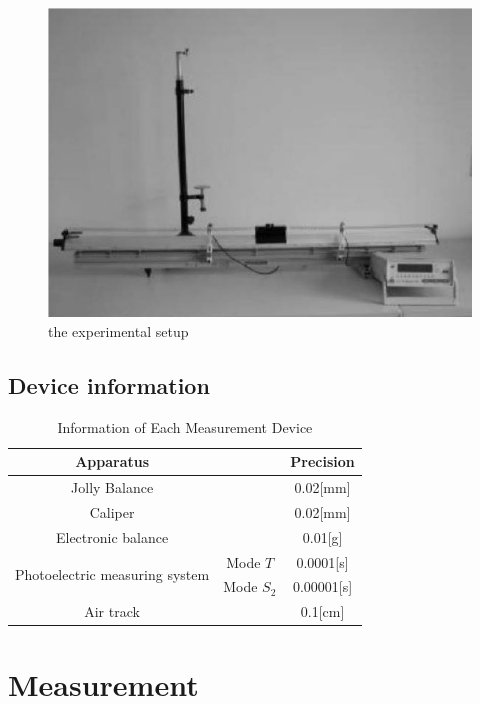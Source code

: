 \documentclass[12pt,a4paper]{article}
\begin{document}
\begin{figure}[H]
    \centering
    \includegraphics[width=12cm]{setup.png}
    \caption{the experimental setup}
\end{figure}

\subsection{Device information}

\begin{table}[H]
    \centering
    \begin{tabular}{ccc}
        \hline
    Apparatus & & Precision \\\hline  
    Jolly Balance & & 0.02[mm] \\ 
    Caliper & & 0.02[mm]  \\
    Electronic balance & & 0.01[g] \\
    \multirow{2}{*}{Photoelectric measuring system} & Mode $T$   & 0.0001[s]       \\
    & Mode $S_2$ & 0.00001[s]     \\
    Air track & & 0.1[cm]       \\\hline
    \end{tabular}
    \caption{Information of Each Measurement Device}
\end{table}

\section{Measurement}
\end{document}
